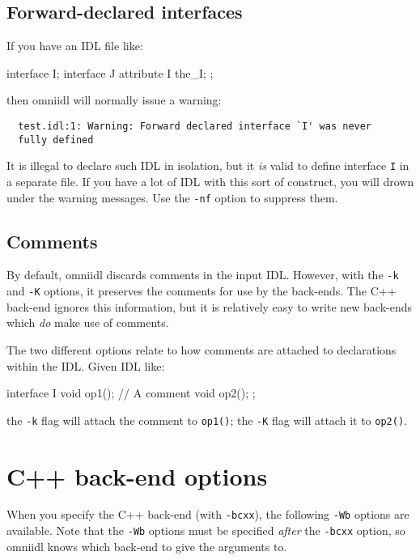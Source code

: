 \documentclass[11pt,oneside,a4paper]{book}
\newcommand{\intf}[1]{\texttt{#1}}
\newcommand{\op}[1]{\texttt{#1()}}
\newcommand{\cmdline}[1]{\texttt{#1}}
\begin{document}
\subsection{Forward-declared interfaces}

If you have an IDL file like:

\begin{idllisting}
interface I;
interface J {
  attribute I the_I;
};
\end{idllisting}

\noindent then omniidl will normally issue a warning:

{\small
\begin{verbatim}
  test.idl:1: Warning: Forward declared interface `I' was never
  fully defined
\end{verbatim}
}

\noindent It is illegal to declare such IDL in isolation, but it
\emph{is} valid to define interface \intf{I} in a separate file. If
you have a lot of IDL with this sort of construct, you will drown
under the warning messages. Use the \cmdline{-nf} option to suppress
them.


\subsection{Comments}

By default, omniidl discards comments in the input IDL. However, with
the \cmdline{-k} and \cmdline{-K} options, it preserves the comments
for use by the back-ends. The C++ back-end ignores this information,
but it is relatively easy to write new back-ends which \emph{do} make
use of comments.

The two different options relate to how comments are attached to
declarations within the IDL. Given IDL like:

\begin{idllisting}
interface I {
  void op1();
  // A comment
  void op2();
};
\end{idllisting}

\noindent the \cmdline{-k} flag will attach the comment to \op{op1};
the \cmdline{-K} flag will attach it to \op{op2}.



\section{C++ back-end options}
\label{sec:cxx_backend}

When you specify the C++ back-end (with \cmdline{-bcxx}), the
following \cmdline{-Wb} options are available. Note that the
\cmdline{-Wb} options must be specified \emph{after} the
\cmdline{-bcxx} option, so omniidl knows which back-end to give the
arguments to.
\end{document}
